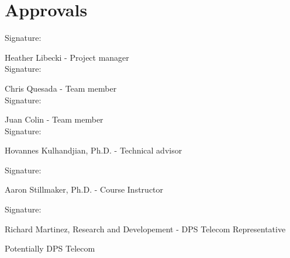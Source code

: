 \section{Approvals}
\setlength{\parindent}{15ex}
\vspace{0.5in}
	\begin{flushleft}
	Signature: \hrulefill
	
	\hspace*{0mm}\phantom{Approved: }Heather Libecki - Project manager\\
	\vspace{12pt}
	Signature: \hrulefill
	
	\hspace*{0mm}\phantom{Approved: }Chris Quesada - Team member\\
	\vspace{12pt}
	Signature: \hrulefill
	
	\hspace*{0mm}\phantom{Approved: }Juan Colin - Team member\\
	\vspace{12pt}
	Signature: \hrulefill
	
	\hspace*{0mm}\phantom{Approved: }Hovannes Kulhandjian, Ph.D. -
	 Technical advisor\\
	 \vspace{12pt}
	 
	 Signature: \hrulefill
	 
	 \hspace*{0mm}\phantom{Approved: }Aaron Stillmaker, Ph.D. -
	 Course Instructor\\
	 \vspace{12pt}
	 
	 Signature: \hrulefill
	 
	 \hspace*{0mm}\phantom{Approved: }Richard Martinez, Research and Developement - DPS Telecom Representative\\
	 \vspace{12pt}
	
	Potentially DPS Telecom
\end{flushleft}\par
\newpage


	
		
 

